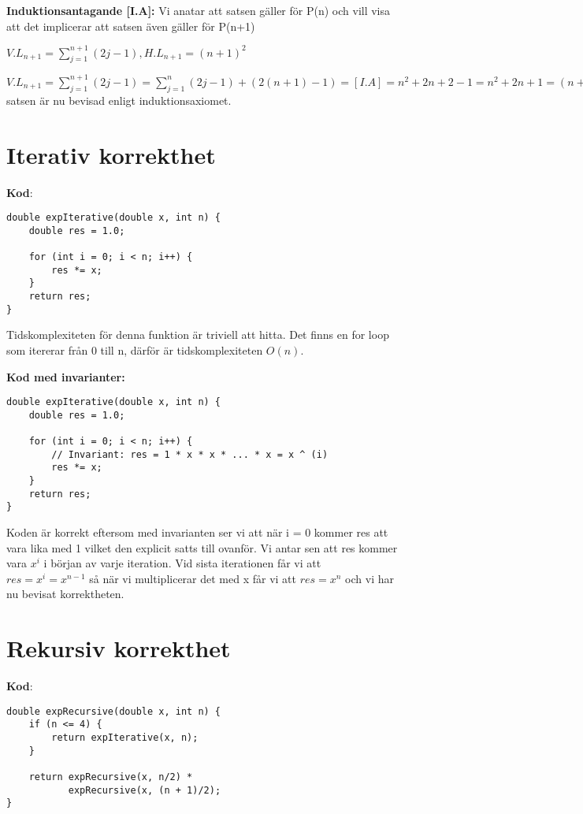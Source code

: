 \documentclass{article}
\begin{document}
\textbf{Induktionsantagande [I.A]: } Vi anatar att satsen gäller för P(n) och vill visa att det implicerar att satsen även gäller för P(n+1)

\vspace{5pt}

$V.L_{n+1} = \sum_{j=1}^{n+1}(2j - 1), H.L_{n+1} = (n+1)^2$

$V.L_{n+1} = \sum_{j=1}^{n+1}(2j - 1) = \sum_{j=1}^{n}(2j - 1) + (2(n+1) - 1) = [I.A] = n^2 + 2n + 2 - 1 = n^2 + 2n + 1 = (n+1)^2 = H.L_{n+1} \implies $ satsen är nu bevisad enligt induktionsaxiomet. 


\section{Iterativ korrekthet}

\textbf{Kod}: 
\begin{lstlisting}
double expIterative(double x, int n) {
    double res = 1.0;

    for (int i = 0; i < n; i++) {
        res *= x;
    }
    return res;
}
\end{lstlisting}

Tidskomplexiteten för denna funktion är triviell att hitta. Det finns en for loop som itererar från 0 till n, därför är tidskomplexiteten $O(n)$.

\textbf{Kod med invarianter: }

\begin{lstlisting}
double expIterative(double x, int n) {
    double res = 1.0;

    for (int i = 0; i < n; i++) {
        // Invariant: res = 1 * x * x * ... * x = x ^ (i)
        res *= x;
    }
    return res;
}
\end{lstlisting} 

Koden är korrekt eftersom med invarianten ser vi att när i = 0 kommer res att vara lika med 1 vilket den explicit satts till ovanför. Vi antar sen att res kommer vara $x^i$ i början av varje iteration. Vid sista iterationen får vi att $res = x^i = x^{n-1}$ så när vi multiplicerar det med x får vi att $res = x^n$ och vi har nu bevisat korrektheten.


\section{Rekursiv korrekthet}
\textbf{Kod}: 
\begin{lstlisting}
double expRecursive(double x, int n) {
    if (n <= 4) {
        return expIterative(x, n);
    }

    return expRecursive(x, n/2) *
           expRecursive(x, (n + 1)/2);
}
\end{lstlisting}
\end{document}
